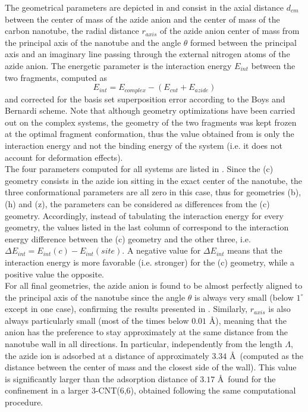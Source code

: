\documentclass[utf8]{article}
\begin{document}
The geometrical parameters are depicted in  and consist in the axial distance $d_{cm}$ between the center of mass of the azide anion and the center of mass of the carbon nanotube, the radial distance $r_{axis}$ of the azide anion center of mass from the principal axis of the nanotube and the angle $\theta$ formed between the principal axis and an imaginary line passing through the external nitrogen atoms of the azide anion.
The energetic parameter is the interaction energy $E_{int}$ between the two fragments, computed as
%
\begin{equation}
    E_{int} = E_{complex} - (E_{cnt} + E_{azide})
\end{equation}
%
and corrected for the basis set superposition error according to the Boys and Bernardi scheme\cite{Boys1970}.
Note that although geometry optimizations have been carried out on the complex systems, the geometry of the two fragments was kept frozen at the optimal fragment conformation, thus the value obtained from  is only the interaction energy and not the binding energy of the system (i.e. it does not account for deformation effects).\\
The four parameters computed for all systems are listed in . Since the (c) geometry consists in the azide ion sitting in the exact center of the nanotube, the three conformational parameters are all zero in this case, thus for geometries (b), (h) and (z), the parameters can be considered as differences from the (c) geometry. Accordingly, instead of tabulating the interaction energy for every geometry, the values listed in the last column of  correspond to the interaction energy difference between the (c) geometry and the other three, i.e. $\Delta E_{int} = E_{int}(c) - E_{int}(site)$. A negative value for $\Delta E_{int}$ means that the interaction energy is more favorable (i.e. stronger) for the (c) geometry, while a positive value the opposite.\\
For all final geometries, the azide anion is found to be almost perfectly aligned to the principal axis of the nanotube since the angle $\theta$ is always very small (below $1^{\circ}$ except in one case), confirming the results presented in \cite{Battaglia2017a}.
Similarly, $r_{axis}$ is also always particularly small (most of the times below $0.01$ \AA), meaning that the anion has the preference to stay approximately at the same distance from the nanotube wall in all directions.
In particular, independently from the length $\Lambda$, the azide ion is adsorbed at a distance of approximately $3.34$ \AA\ (computed as the distance between the \ntm center of mass and the closest side of the wall). This value is significantly larger than the adsorption distance of $3.17$ \AA\ found for the confinement in a larger 3-CNT(6,6), obtained following the same computational procedure.
\end{document}
